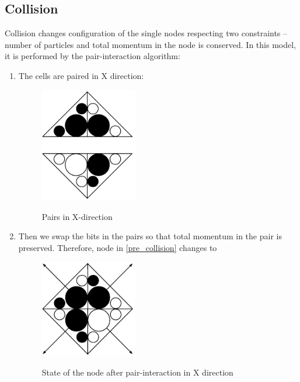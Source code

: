 \subsection{Collision}
Collision changes configuration of the single nodes respecting two constraints -- number of particles and total momentum in the node is conserved. In this model, it is performed by the pair-interaction algorithm:
\begin{enumerate}

\item The cells are paired in X direction:
\begin{figure}[H]
 \centering 
 \includegraphics[width=0.4\textwidth]{./img/x-inter}
 \label{xinter}
 \caption{Pairs in X-direction}
\end{figure}

\item Then we swap the bits in the pairs so that total momentum in the pair is preserved. Therefore, node in \ref{pre_collision} changes to

\begin{figure}[H]
 \centering 
 \includegraphics[width=0.4\textwidth]{./img/beforeY}
 \label{colision1}
 \caption{State of the node after pair-interaction in X direction}
\end{figure}

\newpage


\end{enumerate}
